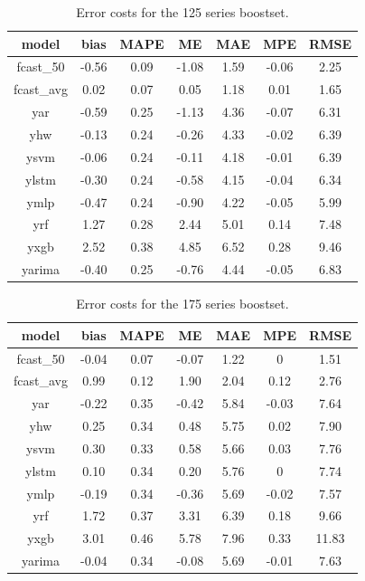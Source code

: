\documentclass[mnsc,sglanonrev]{informs4}  %
\theoremstyle{remark}\newtheorem{remark}{Remark}
\begin{document}
\begin{APPENDICES}
\begin{table}[h]
	\centering
	\renewcommand{\arraystretch}{1.0}
	\begin{tabular}{ccccccc}
		model & bias & MAPE & ME & MAE & MPE & RMSE \\
		\hline
		fcast\_50   & -0.56 & 0.09 & -1.08 & 1.59 & -0.06 & 2.25  \\
		fcast\_avg  &  0.02 & 0.07 &  0.05 & 1.18 &  0.01 & 1.65  \\
		yar         & -0.59 & 0.25 & -1.13 & 4.36 & -0.07 & 6.31  \\
		yhw         & -0.13 & 0.24 & -0.26 & 4.33 & -0.02 & 6.39  \\
		ysvm        & -0.06 & 0.24 & -0.11 & 4.18 & -0.01 & 6.39  \\
		ylstm       & -0.30 & 0.24 & -0.58 & 4.15 & -0.04 & 6.34  \\
		ymlp        & -0.47 & 0.24 & -0.90 & 4.22 & -0.05 & 5.99  \\
		yrf         &  1.27 & 0.28 &  2.44 & 5.01 &  0.14 & 7.48  \\
		yxgb        &  2.52 & 0.38 &  4.85 & 6.52 &  0.28 & 9.46  \\
		yarima      & -0.40 & 0.25 & -0.76 & 4.44 & -0.05 & 6.83  \\
		\hline
	\end{tabular}
	\caption{Error costs for the 125 series boostset.}
	\label{table:app125}
\end{table}

\begin{table}[h]
	\centering
	\renewcommand{\arraystretch}{1.0}
	\begin{tabular}{ccccccc}
		model & bias & MAPE & ME & MAE & MPE & RMSE \\
		\hline
		fcast\_50  & -0.04 & 0.07 & -0.07 & 1.22 & 0     & 1.51 \\
		fcast\_avg & 0.99  & 0.12 & 1.90  & 2.04 & 0.12  & 2.76 \\
		yar        & -0.22 & 0.35 & -0.42 & 5.84 & -0.03 & 7.64 \\
		yhw        & 0.25  & 0.34 & 0.48  & 5.75 & 0.02  & 7.90 \\
		ysvm       & 0.30  & 0.33 & 0.58  & 5.66 & 0.03  & 7.76 \\
		ylstm      & 0.10  & 0.34 & 0.20  & 5.76 & 0     & 7.74 \\
		ymlp       & -0.19 & 0.34 & -0.36 & 5.69 & -0.02 & 7.57 \\
		yrf        & 1.72  & 0.37 & 3.31  & 6.39 & 0.18  & 9.66 \\
		yxgb       & 3.01  & 0.46 & 5.78  & 7.96 & 0.33  & 11.83\\
		yarima     & -0.04 & 0.34 & -0.08 & 5.69 & -0.01 & 7.63 \\
		\hline
	\end{tabular}
	\caption{Error costs for the 175 series boostset.}
	\label{table:app175}
\end{table}


\end{APPENDICES}
\end{document}
